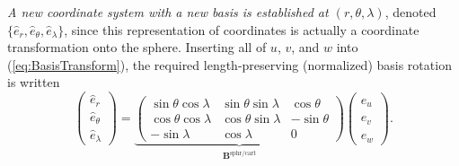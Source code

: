 \documentclass[11pt,dvipsnames]{thesis}
\begin{document}
\textit{A new coordinate system with a new basis is established at $(r, \theta, \lambda)$}, denoted $\{\hat{e}_r, \hat{e}_\theta, \hat{e}_\lambda\}$, since this representation of coordinates is actually a coordinate transformation onto the sphere. Inserting all of $u$, $v$, and $w$ into (\ref{eq:BasisTransform}), the required length-preserving (normalized) basis rotation is written
\begin{equation}
\begin{pmatrix}\hat{e}_r \\ \hat{e}_\theta \\ \hat{e}_\lambda\end{pmatrix} = \underbrace{\begin{pmatrix}\sin\theta\cos\lambda & \sin\theta\sin\lambda & \cos\theta \\ \cos\theta\cos\lambda & \cos\theta\sin\lambda & -\sin\theta \\ -\sin\lambda & \cos\lambda & 0\end{pmatrix}}_{\mathbf{B}^{\text{sphr}/\text{cart}}} \begin{pmatrix}\hat{e}_u \\ \hat{e}_v \\ \hat{e}_w\end{pmatrix}.
\end{equation}
\end{document}
